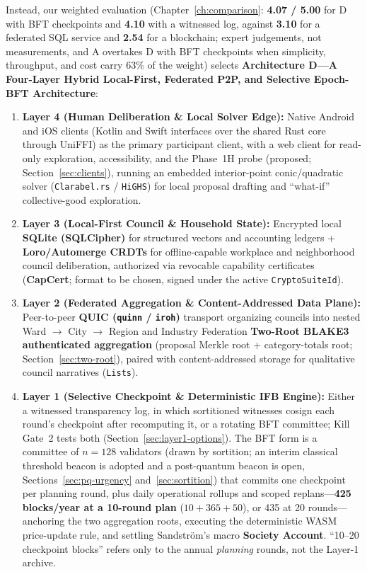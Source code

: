 \documentclass[10pt,twoside,openany]{book}
\theoremstyle{dpepstyle}
\begin{document}
Instead, our weighted evaluation (Chapter~\ref{ch:comparison}: \textbf{4.07 / 5.00} for D with BFT checkpoints and \textbf{4.10} with a witnessed log, against \textbf{3.10} for a federated SQL service and \textbf{2.54} for a blockchain; expert judgements, not measurements, and A overtakes D with BFT checkpoints when simplicity, throughput, and cost carry 63\% of the weight) selects \textbf{Architecture D---A Four-Layer Hybrid Local-First, Federated P2P, and Selective Epoch-BFT Architecture}:
\begin{enumerate}[leftmargin=1.8em,itemsep=2pt]
  \item \textbf{Layer 4 (Human Deliberation \& Local Solver Edge):} Native Android and iOS clients (Kotlin and Swift interfaces over the shared Rust core through UniFFI) as the primary participant client, with a web client for read-only exploration, accessibility, and the Phase~1H probe (proposed; Section~\ref{sec:clients}), running an embedded interior-point conic/quadratic solver (\texttt{Clarabel.rs} / \texttt{HiGHS}) for local proposal drafting and ``what-if'' collective-good exploration.
  \item \textbf{Layer 3 (Local-First Council \& Household State):} Encrypted local \textbf{SQLite (SQLCipher)} for structured vectors and accounting ledgers + \textbf{Loro/Automerge CRDTs} for offline-capable workplace and neighborhood council deliberation, authorized via revocable capability certificates (\textbf{CapCert}; format to be chosen, signed under the active \texttt{CryptoSuiteId}).
  \item \textbf{Layer 2 (Federated Aggregation \& Content-Addressed Data Plane):} Peer-to-peer \textbf{QUIC (\texttt{quinn} / \texttt{iroh})} transport organizing councils into nested Ward $\to$ City $\to$ Region and Industry Federation \textbf{Two-Root BLAKE3 authenticated aggregation} (proposal Merkle root + category-totals root; Section~\ref{sec:two-root}), paired with content-addressed storage for qualitative council narratives (\texttt{Lists}).
  \item \textbf{Layer 1 (Selective Checkpoint \& Deterministic IFB Engine):} Either a witnessed transparency log, in which sortitioned witnesses cosign each round's checkpoint after recomputing it, or a rotating BFT committee; Kill Gate~2 tests both (Section~\ref{sec:layer1-options}). The BFT form is a committee of $n=128$ validators (drawn by sortition; an interim classical threshold beacon is adopted and a post-quantum beacon is open, Sections~\ref{sec:pq-urgency} and~\ref{sec:sortition}) that commits one checkpoint per planning round, plus daily operational rollups and scoped replans---\textbf{425 blocks/year at a 10-round plan} ($10+365+50$), or 435 at 20 rounds---anchoring the two aggregation roots, executing the deterministic WASM price-update rule, and settling Sandstr\"om's macro \textbf{Society Account}. ``10--20 checkpoint blocks'' refers only to the annual \emph{planning} rounds, not the Layer-1 archive.
\end{enumerate}
\end{document}
